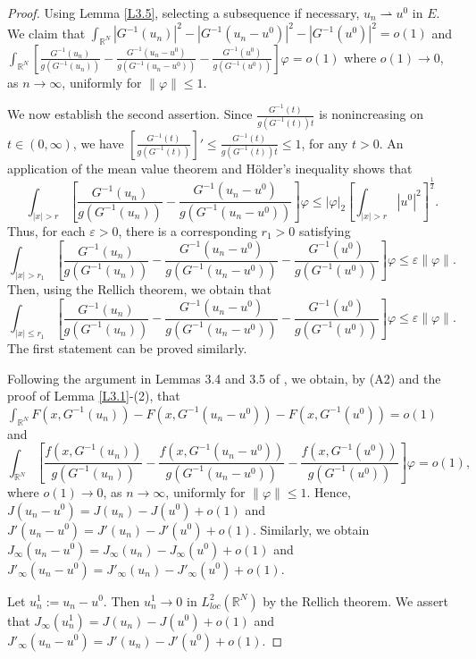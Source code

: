 \documentclass[10pt,a4paper]{amsart}
\numberwithin{equation}{section}
\begin{document}
\begin{proof}  
Using Lemma \ref{L3.5},  selecting a subsequence if necessary,  $u_n\rightharpoonup u^0$ in $E$. 
 We claim that $\int_{\mathbb{R}^N}|G^{-1}(u_n)|^2-|G^{-1}(u_n-u^0)|^2-|G^{-1}(u^0)|^2=o(1)$ and 
 $\int_{\mathbb{R}^N}[\frac{G^{-1}(u_n)}{g(G^{-1}(u_n))}-\frac{G^{-1}(u_n-u^0)}{g(G^{-1}(u_n-u^0))}
 -\frac{G^{-1}(u^0)}{g(G^{-1}(u^0))}]\varphi=o(1)$ where $o(1)\to0$, as $n\to\infty$, 
 uniformly for $\|\varphi\|\leq1$.

We now establish the second assertion. Since $\frac{G^{-1}(t)}{g(G^{-1}(t))t}$ is nonincreasing 
on $t\in(0,\infty)$, we have $[\frac{G^{-1}(t)}{g(G^{-1}(t))}]'\leq \frac{G^{-1}(t)}{g(G^{-1}(t))t}\leq1$, 
for any $t>0$. An application of the mean value theorem and H\"older's inequality shows that 
$$
\int_{|x|>r}[\frac{G^{-1}(u_n)}{g(G^{-1}(u_n))}-\frac{G^{-1}(u_n-u^0)}{g(G^{-1}(u_n-u^0))}]
\varphi\leq|\varphi|_{2}[\int_{|x|>r}|u^0|^2]^\frac{1}{2}.
$$ 
Thus, for each $\varepsilon > 0$, there is a corresponding $r_1 > 0$ satisfying 
$$
\int_{|x|>r_1}[\frac{G^{-1}(u_n)}{g(G^{-1}(u_n))}-\frac{G^{-1}(u_n-u^0)}{g(G^{-1}(u_n-u^0))}-\frac{G^{-1}(u^0)}{g(G^{-1}(u^0))}]\varphi\leq\varepsilon\|\varphi\|.
$$  
Then, using the Rellich theorem, we obtain that 
$$
\int_{|x|\leq r_1}[\frac{G^{-1}(u_n)}{g(G^{-1}(u_n))}-\frac{G^{-1}(u_n-u^0)}{g(G^{-1}(u_n-u^0))}-\frac{G^{-1}(u^0)}{g(G^{-1}(u^0))}]\varphi\leq\varepsilon\|\varphi\|.
$$  
The first statement can be proved similarly.

Following the argument in  Lemmas 3.4 and 3.5 of \cite{Yang}, we obtain, by (A2) and the 
proof of Lemma \ref{L3.1}-(2),  that
$\int_{\mathbb{R}^N}F(x,G^{-1}(u_n))-F(x,G^{-1}(u_n-u^0))-F(x,G^{-1}(u^0))=o(1)$ and
\[
\int_{\mathbb{R}^N}[\frac{f(x,G^{-1}(u_n))}{g(G^{-1}(u_n))}
-\frac{f(x,G^{-1}(u_n-u^0))}{g(G^{-1}(u_n-u^0))}-\frac{f(x,G^{-1}(u^0))}{g(G^{-1}(u^0))}]\varphi=o(1), 
\]
where $o(1)\to0$, as $n\to\infty$, uniformly for $\|\varphi\|\leq1$. 
Hence, $J(u_n-u^0)=J(u_n)-J(u^0)+o(1)$ and $J'(u_n-u^0)=J'(u_n)-J'(u^0)+o(1)$. 
Similarly, we obtain $J_\infty(u_n-u^0)=J_\infty(u_n)-J_\infty(u^0)+o(1)$  and 
$J'_\infty(u_n-u^0)=J'_\infty(u_n)-J'_\infty(u^0)+o(1)$. 
 
Let $u^1_n:=u_n-u^0$. Then $u^1_n\to 0$ in $L^2_{loc}({\mathbb{R}^N})$ by the Rellich theorem. 
We assert that  $J_\infty(u^1_n)=J(u_n)-J(u^0)+o(1)$ and $J'_\infty(u_n-u^0)=J'(u_n)-J'(u^0)+o(1)$.


\end{proof}
\end{document}
